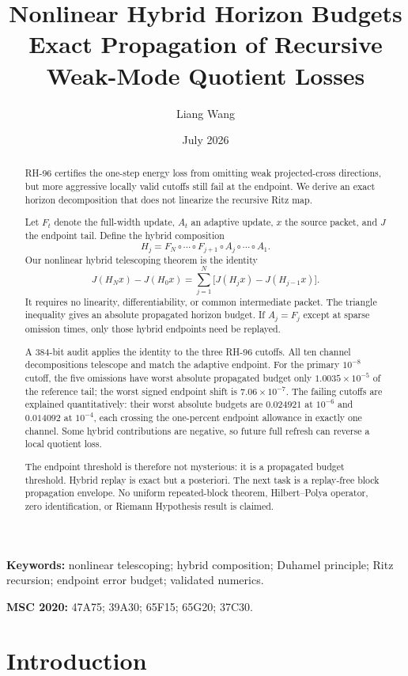 \documentclass[11pt]{article}
\title{Nonlinear Hybrid Horizon Budgets\\
\large Exact Propagation of Recursive Weak-Mode Quotient Losses}
\author{Liang Wang}
\date{July 2026}
\theoremstyle{definition}
\theoremstyle{remark}
\begin{document}
\maketitle

\begin{abstract}
RH-96 certifies the one-step energy loss from omitting weak projected-cross
directions, but more aggressive locally valid cutoffs still fail at the
endpoint.  We derive an exact horizon decomposition that does not linearize
the recursive Ritz map.

Let $F_t$ denote the full-width update, $A_t$ an adaptive update, $x$ the
source packet, and $J$ the endpoint tail.  Define the hybrid composition
\[
 H_j=F_N\circ\cdots\circ F_{j+1}\circ
 A_j\circ\cdots\circ A_1.
\]
Our nonlinear hybrid telescoping theorem is the identity
\[
 J(H_Nx)-J(H_0x)
 =\sum_{j=1}^N\bigl[J(H_jx)-J(H_{j-1}x)\bigr].
\]
It requires no linearity, differentiability, or common intermediate packet.
The triangle inequality gives an absolute propagated horizon budget.  If
$A_j=F_j$ except at sparse omission times, only those hybrid endpoints need
be replayed.

A 384-bit audit applies the identity to the three RH-96 cutoffs.  All ten
channel decompositions telescope and match the adaptive endpoint.  For the
primary $10^{-8}$ cutoff, the five omissions have worst absolute propagated
budget only $1.0035\times10^{-5}$ of the reference tail; the worst signed
endpoint shift is $7.06\times10^{-7}$.  The failing cutoffs are explained
quantitatively: their worst absolute budgets are $0.024921$ at $10^{-6}$ and
$0.014092$ at $10^{-4}$, each crossing the one-percent endpoint allowance in
exactly one channel.  Some hybrid contributions are negative, so future full
refresh can reverse a local quotient loss.

The endpoint threshold is therefore not mysterious: it is a propagated
budget threshold.  Hybrid replay is exact but a posteriori.  The next task is
a replay-free block propagation envelope.  No uniform repeated-block theorem,
Hilbert--Polya operator, zero identification, or Riemann Hypothesis result is
claimed.
\end{abstract}

\noindent\textbf{Keywords:} nonlinear telescoping; hybrid composition;
Duhamel principle; Ritz recursion; endpoint error budget; validated numerics.

\medskip
\noindent\textbf{MSC 2020:} 47A75; 39A30; 65F15; 65G20; 37C30.

\section{Introduction}
\end{document}
